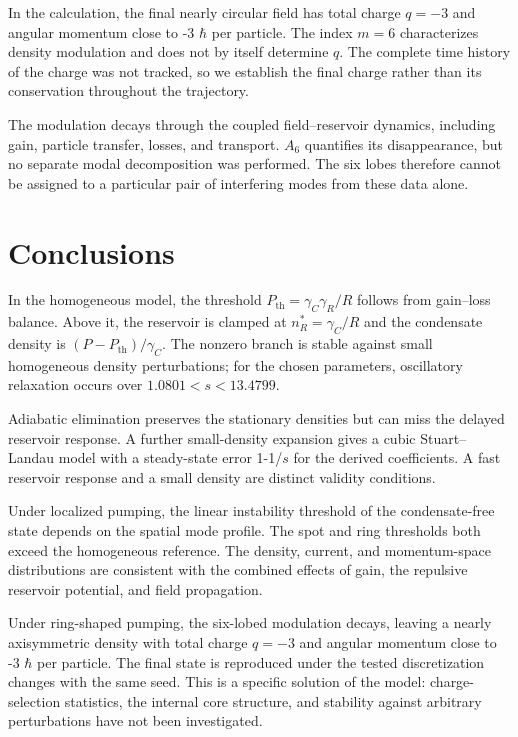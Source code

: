 \documentclass[12pt,a4paper]{article}
\begin{document}
In the calculation, the final nearly circular field has total charge $q=-3$ and angular momentum close to -3 $\hbar$ per particle. The index $m=6$ characterizes density modulation and does not by itself determine $q$. The complete time history of the charge was not tracked, so we establish the final charge rather than its conservation throughout the trajectory.

The modulation decays through the coupled field--reservoir dynamics, including gain, particle transfer, losses, and transport. $A_{6}$ quantifies its disappearance, but no separate modal decomposition was performed. The six lobes therefore cannot be assigned to a particular pair of interfering modes from these data alone.

\clearpage

\section{Conclusions}\label{sec:10}

In the homogeneous model, the threshold $P_{\mathrm{th}}=\gamma_{C} \gamma_{R}/R$ follows from gain--loss balance. Above it, the reservoir is clamped at $n_{R}^{*}=\gamma_{C}/R$ and the condensate density is $(P-P_{\mathrm{th}})/\gamma_{C}$. The nonzero branch is stable against small homogeneous density perturbations; for the chosen parameters, oscillatory relaxation occurs over $1.0801<s<13.4799$.

Adiabatic elimination preserves the stationary densities but can miss the delayed reservoir response. A further small-density expansion gives a cubic Stuart--Landau model with a steady-state error 1-1/$s$ for the derived coefficients. A fast reservoir response and a small density are distinct validity conditions.

Under localized pumping, the linear instability threshold of the condensate-free state depends on the spatial mode profile. The spot and ring thresholds both exceed the homogeneous reference. The density, current, and momentum-space distributions are consistent with the combined effects of gain, the repulsive reservoir potential, and field propagation.

Under ring-shaped pumping, the six-lobed modulation decays, leaving a nearly axisymmetric density with total charge $q=-3$ and angular momentum close to -3 $\hbar$ per particle. The final state is reproduced under the tested discretization changes with the same seed. This is a specific solution of the model: charge-selection statistics, the internal core structure, and stability against arbitrary perturbations have not been investigated.
\end{document}
